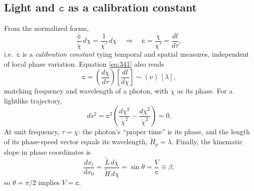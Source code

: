\documentclass[11pt]{article}
\numberwithin{equation}{section}
\begin{document}
\subsection{\texorpdfstring{Light and $\mathtt{c}$ as a calibration constant}{Light and c as a calibration constant}}
From the normalized forms,
\begin{equation}
\frac{\mathtt{c}}{\dot{\chi}}\,d\chi=\frac{1}{\chi'}\,d\chi
\quad\Rightarrow\quad
\mathtt{c}=\frac{\dot{\chi}}{\chi'}=\frac{dl}{d\tau},
\label{eq:341}
\end{equation}
i.e.\ $\mathtt{c}$ is a \emph{calibration constant} tying temporal and spatial measures, independent of local phase variation. Equation \eqref{eq:341} also reads
\begin{equation}
\mathtt{c}=\left(\frac{d\chi}{d\tau}\right)\!\left[\frac{dl}{d\chi}\right]\sim (\nu)\,[\lambda],
\label{eq:343}
\end{equation}
matching frequency and wavelength of a photon, with $\chi$ as its phase. For a lightlike trajectory,
\begin{equation}
ds^2=\mathtt{c}^2\!\left(\frac{d\chi^2}{\dot{\chi}^2}-\frac{d\chi^2}{\dot{\chi}^2}\right)=0.
\label{eq:344}
\end{equation}
At unit frequency, $\tau=\chi$: the photon's ``proper time'' is its phase, and the length of its phase-speed vector equals its wavelength, $\tilde{H}_p=\lambda$. Finally, the kinematic slope in phase coordinates is
\begin{equation}
\frac{dx_l}{dx_0}
=\frac{\tilde{L}\,d\chi}{\tilde{H}\,d\chi}
=\sin\theta
=\frac{V}{\mathtt{c}}
\equiv \beta,
\label{eq:345}
\end{equation}
so $\theta=\pi/2$ implies $V=\mathtt{c}$.
\end{document}
